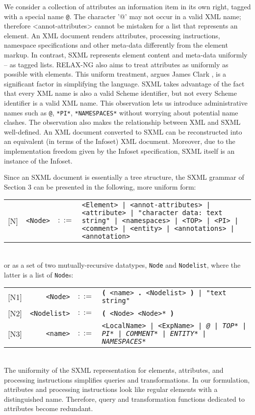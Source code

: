 \documentclass[10pt]{article}
\begin{document}
We consider a collection of attributes an information item in its
own right, tagged with a special name \texttt{@}. The character '@'
may not occur in a valid XML name; therefore <annot-attributes> cannot be mistaken for a list that represents an element. An XML
document renders attributes, processing instructions, namespace
specifications and other meta-data differently from the element
markup. In contrast, SXML represents element content and meta-data
uniformly -- as tagged lists. RELAX-NG also aims to treat attributes
as uniformly as possible with elements. This uniform treatment, argues James
Clark \cite{RNG-Design}, is a significant factor
in simplifying the language.  SXML takes advantage of the fact that
every XML name is also a valid Scheme identifier, but not every
Scheme identifier is a valid XML name. This observation lets us
introduce administrative names such as \texttt{@}, \texttt{*PI*}, \texttt{*NAMESPACES*} without worrying about potential name
clashes. The observation also makes the relationship between XML and SXML
well-defined. An XML document converted to SXML can be reconstructed
into an equivalent (in terms of the Infoset) XML document. Moreover, due
to the implementation freedom given by the Infoset specification, SXML
itself is an instance of the Infoset.

Since an SXML document is essentially a tree structure, the SXML grammar of Section 3 can be presented in the following, more uniform form:

\begin{tabular}{rrcp{2.8in}}
{[}N{]} & \texttt{<Node>} &  $::=$ & \texttt{<Element> | <annot-attributes> | <attribute> | "character data: text string" | <namespaces> | <TOP> | <PI> | <comment> | <entity> | <annotations> | <annotation> } \\
\end{tabular}
\\
or as a set of two mutually-recursive datatypes, 
\texttt{Node} and \texttt{Nodelist}, where the latter is a
list of \texttt{Node}s: 

\begin{tabular}{rrcp{2.8in}}
{[}N1{]} & \texttt{<Node>} &  $::=$ & \texttt{\textbf{(} <name>\textbf{ . }<Nodelist> \textbf{)} | "text string" } \\
{[}N2{]} & \texttt{<Nodelist>} &  $::=$ & \texttt{\textbf{(} <Node> <Node>* \textbf{)} } \\
{[}N3{]} & \texttt{<name>} &  $::=$ & \texttt{<LocalName> | <ExpName> | {\itshape @} | {\itshape *TOP*} | {\itshape *PI*} | {\itshape *COMMENT*} | {\itshape *ENTITY*} | {\itshape *NAMESPACES*} } \\
\end{tabular}
\\
The uniformity of the SXML representation for elements,
attributes, and processing instructions simplifies queries and
transformations. In our formulation, attributes and processing
instructions look like regular elements with a distinguished
name. Therefore, query and transformation functions dedicated to
attributes become redundant.
\end{document}
